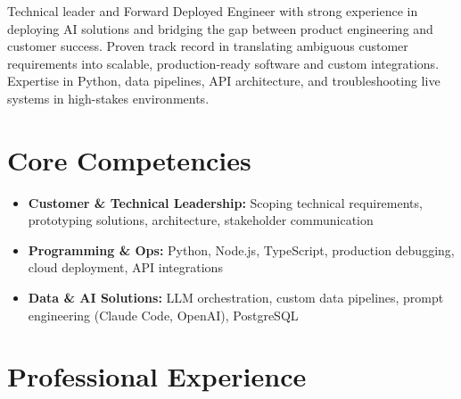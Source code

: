 \documentclass[11pt,a4paper,sans]{moderncv}
\begin{document}
\makecvtitle

Technical leader and Forward Deployed Engineer with strong experience in deploying AI solutions and bridging the gap between product engineering and customer success. Proven track record in translating ambiguous customer requirements into scalable, production-ready software and custom integrations. Expertise in Python, data pipelines, API architecture, and troubleshooting live systems in high-stakes environments.

\vspace{3pt}
\section{Core Competencies}
\begin{itemize}
\item \textbf{Customer \& Technical Leadership:} Scoping technical requirements, prototyping solutions, architecture, stakeholder communication
\item \textbf{Programming \& Ops:} Python, Node.js, TypeScript, production debugging, cloud deployment, API integrations
\item \textbf{Data \& AI Solutions:} LLM orchestration, custom data pipelines, prompt engineering (Claude Code, OpenAI), PostgreSQL
\end{itemize}

\section{Professional Experience}
\vspace{1pt}
\end{document}
